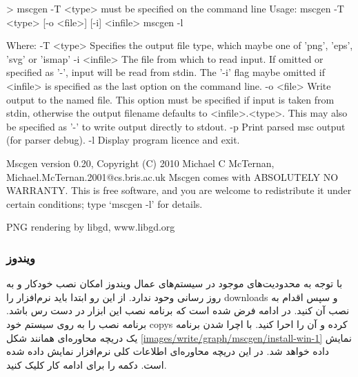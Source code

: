 \begin{Shell}
> mscgen
-T <type> must be specified on the command line                                                         
Usage: mscgen -T <type> [-o <file>] [-i] <infile>                                                       
       mscgen -l                                                                                        

Where:                                                                                                  
 -T <type>   Specifies the output file type, which maybe one of 'png', 'eps',
             'svg' or 'ismap'
 -i <infile> The file from which to read input.  If omitted or specified as
              '-', input will be read from stdin.  The '-i' flag maybe
              omitted if <infile> is specified as the last option on the
              command line.
 -o <file>   Write output to the named file.  This option must be specified if 
              input is taken from stdin, otherwise the output filename
              defaults to <infile>.<type>.  This may also be specified as '-'
              to write output directly to stdout.
 -p          Print parsed msc output (for parser debug).
 -l          Display program licence and exit.

Mscgen version 0.20, Copyright (C) 2010 Michael C McTernan,
                                        Michael.McTernan.2001@cs.bris.ac.uk
Mscgen comes with ABSOLUTELY NO WARRANTY.  This is free software, and you are
welcome to redistribute it under certain conditions; type `mscgen -l' for
details.

PNG rendering by libgd, www.libgd.org
\end{Shell}

\subsubsection{ویندوز}

با توجه به محدودیت‌های موجود در سیستم‌های عمال ویندوز امکان نصب خودکار و به روز
رسانی وحود ندارد. از این رو ابتدا باید نرم‌افزار را \glspl{download} و سپس اقدام
به نصب آن کنید. در ادامه فرض شده است که برنامه نصب این ابزار در دست رس باشد.
برنامه نصب را به روی سیستم خود \glspl{copy} کرده و آن را احرا کنید. با اچرا شدن
برنامه یک دریچه محاوره‌ای همانند شکل \ref{images/write/graph/mscgen/install-win-1}
نمایش داده خواهد شد.
در این دریچه محاوره‌ای اطلاعات کلی نرم‌افزار نمایش داده شده است. دکمه 
را برای ادامه کار کلیک کنید.

